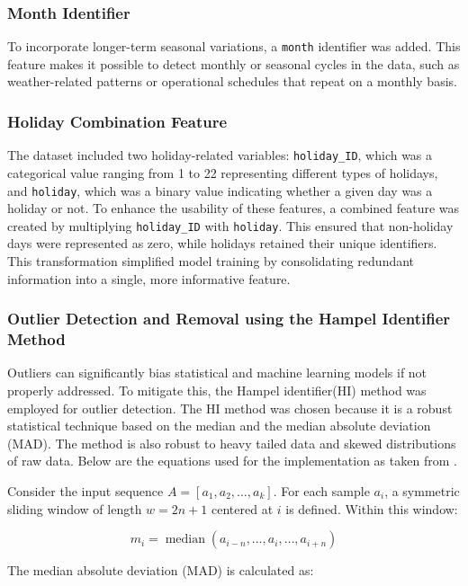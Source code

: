 \subsubsection{Month Identifier}
To incorporate longer-term seasonal variations, a \texttt{month} identifier was added. This feature makes it possible to detect monthly or seasonal cycles in the data, such as weather-related patterns or operational schedules that repeat on a monthly basis.

\subsubsection{Holiday Combination Feature}
The dataset included two holiday-related variables: \texttt{holiday\_ID}, which was a categorical value ranging from 1 to 22 representing different types of holidays, and \texttt{holiday}, which was a binary value indicating whether a given day was a holiday or not. To enhance the usability of these features, a combined feature was created by multiplying \texttt{holiday\_ID} with \texttt{holiday}. This ensured that non-holiday days were represented as zero, while holidays retained their unique identifiers. This transformation simplified model training by consolidating redundant information into a single, more informative feature.

\subsubsection{Outlier Detection and Removal using the Hampel Identifier Method \label{sec:HI_method}}
Outliers can significantly bias statistical and machine learning models if not properly addressed. To mitigate this, the Hampel identifier(HI) method was employed for outlier detection. The HI method was chosen because it is a robust statistical technique based on the median and the median absolute deviation (MAD)\cite{hiceemdanQteg}. The method is also robust to heavy tailed data and skewed distributions of raw data. Below are the equations used for the implementation as taken from \cite{hiceemdanQteg}.

Consider the input sequence \(A = [a_1, a_2, \ldots, a_k]\). For each sample \(a_i\), a symmetric sliding window of length \(w = 2n + 1\) centered at \(i\) is defined. Within this window:

\[
m_i = \operatorname{median}(a_{i-n}, \ldots, a_i, \ldots, a_{i+n})
\]

The median absolute deviation (MAD) is calculated as:

